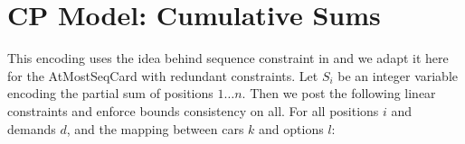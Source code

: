 \documentclass[]{llncs}
\newcommand{\TODO}[1]{ {\color{red}{#1} }}
\newcommand{\AtMostSeqCard}{AtMostSeqCard }
\begin{document}
%
%
%
%
%
%
%
%
%
%

\section{CP Model: Cumulative Sums}

This encoding uses the idea behind sequence constraint in \cite{Brand07}
and we adapt it here for the \AtMostSeqCard with redundant constraints.
Let $S_i$ be an integer variable encoding the partial sum of positions
$1\ldots n$. Then we post the following linear constraints and enforce
bounds consistency on all. For all positions $i$ and demands $d$, and
the mapping between cars $k$ and options $l$: 
\end{document}
